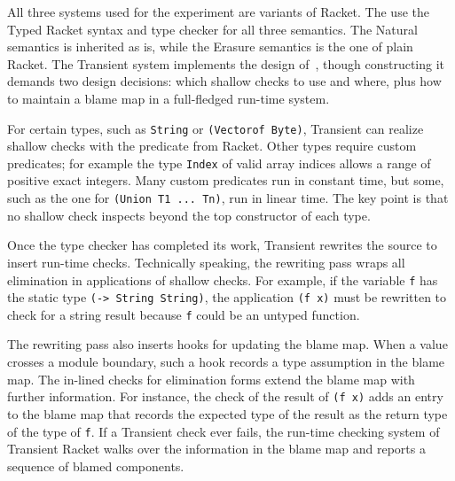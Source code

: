 All three systems used for the experiment are variants of Racket. The
use the Typed Racket syntax and type checker for all three
semantics. The Natural semantics is inherited as is, while the Erasure
semantics is the one of plain Racket.  The Transient system implements
the design of~\citet{vss-popl-2017}, though constructing it demands
two design decisions: which shallow checks to use and where, plus how
to maintain a blame map in a full-fledged run-time system.

For certain types, such as {\tt String} or {\tt (Vectorof Byte)}, Transient can
realize shallow checks with the predicate from Racket.  Other types require
custom predicates; for example the type {\tt Index} of valid array indices
allows a range of positive exact integers.  Many custom predicates run in
constant time, but some, such as the one for {\tt (Union T1 ... Tn)}, run in
linear time. The key point is that no shallow check inspects beyond the top
constructor of each type.

Once the type checker has completed its work, Transient rewrites the
source to insert run-time checks. Technically speaking, the rewriting
pass wraps all elimination in applications of shallow checks.  For
example, if the variable {\tt f} has the static type {\tt (-> String
String)}, the application {\tt (f x)} must be rewritten to check for a
string result because {\tt f} could be an untyped function.

The rewriting pass also inserts hooks for updating the blame map.  When a value
crosses a module boundary, such a hook records a type assumption in the blame
map.  The in-lined checks for elimination forms extend the blame map with
further information. For instance, the check of the result of {\tt (f x)} adds
an entry to the blame map that records the expected type of the result as the
return type of the type of {\tt f}.  If a Transient check ever fails, the
run-time checking system of Transient Racket walks over the information in the
blame map and reports a sequence of blamed components.


